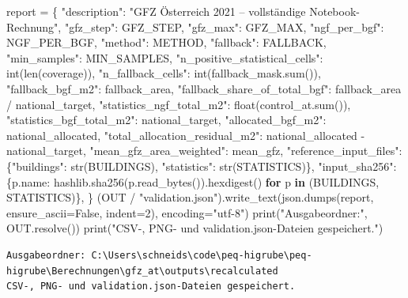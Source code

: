 \documentclass[
  ngerman,
  a4paper,
  DIV=11]{scrreprt}
\newenvironment{Shaded}{\begin{snugshade}}{\end{snugshade}}
\newcommand{\BuiltInTok}[1]{\textcolor[rgb]{0.00,0.23,0.31}{#1}}
\newcommand{\ControlFlowTok}[1]{\textcolor[rgb]{0.00,0.23,0.31}{\textbf{#1}}}
\newcommand{\DecValTok}[1]{\textcolor[rgb]{0.68,0.00,0.00}{#1}}
\newcommand{\KeywordTok}[1]{\textcolor[rgb]{0.00,0.23,0.31}{\textbf{#1}}}
\newcommand{\NormalTok}[1]{\textcolor[rgb]{0.00,0.23,0.31}{#1}}
\newcommand{\OperatorTok}[1]{\textcolor[rgb]{0.37,0.37,0.37}{#1}}
\newcommand{\StringTok}[1]{\textcolor[rgb]{0.13,0.47,0.30}{#1}}
\newcommand{\VariableTok}[1]{\textcolor[rgb]{0.07,0.07,0.07}{#1}}
\begin{document}
\begin{Shaded}
\begin{Highlighting}[]
\NormalTok{report }\OperatorTok{=}\NormalTok{ \{}
    \StringTok{"description"}\NormalTok{: }\StringTok{"GFZ Österreich 2021 – vollständige Notebook{-}Rechnung"}\NormalTok{,}
    \StringTok{"gfz\_step"}\NormalTok{: GFZ\_STEP, }\StringTok{"gfz\_max"}\NormalTok{: GFZ\_MAX, }\StringTok{"ngf\_per\_bgf"}\NormalTok{: NGF\_PER\_BGF,}
    \StringTok{"method"}\NormalTok{: METHOD, }\StringTok{"fallback"}\NormalTok{: FALLBACK, }\StringTok{"min\_samples"}\NormalTok{: MIN\_SAMPLES,}
    \StringTok{"n\_positive\_statistical\_cells"}\NormalTok{: }\BuiltInTok{int}\NormalTok{(}\BuiltInTok{len}\NormalTok{(coverage)),}
    \StringTok{"n\_fallback\_cells"}\NormalTok{: }\BuiltInTok{int}\NormalTok{(fallback\_mask.}\BuiltInTok{sum}\NormalTok{()),}
    \StringTok{"fallback\_bgf\_m2"}\NormalTok{: fallback\_area,}
    \StringTok{"fallback\_share\_of\_total\_bgf"}\NormalTok{: fallback\_area }\OperatorTok{/}\NormalTok{ national\_target,}
    \StringTok{"statistics\_ngf\_total\_m2"}\NormalTok{: }\BuiltInTok{float}\NormalTok{(control\_at.}\BuiltInTok{sum}\NormalTok{()),}
    \StringTok{"statistics\_bgf\_total\_m2"}\NormalTok{: national\_target,}
    \StringTok{"allocated\_bgf\_m2"}\NormalTok{: national\_allocated,}
    \StringTok{"total\_allocation\_residual\_m2"}\NormalTok{: national\_allocated }\OperatorTok{{-}}\NormalTok{ national\_target,}
    \StringTok{"mean\_gfz\_area\_weighted"}\NormalTok{: mean\_gfz,}
    \StringTok{"reference\_input\_files"}\NormalTok{: \{}\StringTok{"buildings"}\NormalTok{: }\BuiltInTok{str}\NormalTok{(BUILDINGS), }\StringTok{"statistics"}\NormalTok{: }\BuiltInTok{str}\NormalTok{(STATISTICS)\},}
    \StringTok{"input\_sha256"}\NormalTok{: \{p.name: hashlib.sha256(p.read\_bytes()).hexdigest()}
                     \ControlFlowTok{for}\NormalTok{ p }\KeywordTok{in}\NormalTok{ (BUILDINGS, STATISTICS)\},}
\NormalTok{\}}
\NormalTok{(OUT }\OperatorTok{/} \StringTok{"validation.json"}\NormalTok{).write\_text(json.dumps(report, ensure\_ascii}\OperatorTok{=}\VariableTok{False}\NormalTok{, indent}\OperatorTok{=}\DecValTok{2}\NormalTok{), encoding}\OperatorTok{=}\StringTok{"utf{-}8"}\NormalTok{)}
\BuiltInTok{print}\NormalTok{(}\StringTok{"Ausgabeordner:"}\NormalTok{, OUT.resolve())}
\BuiltInTok{print}\NormalTok{(}\StringTok{"CSV{-}, PNG{-} und validation.json{-}Dateien gespeichert."}\NormalTok{)}
\end{Highlighting}
\end{Shaded}

\begin{verbatim}
Ausgabeordner: C:\Users\schneids\code\peq-higrube\peq-higrube\Berechnungen\gfz_at\outputs\recalculated
CSV-, PNG- und validation.json-Dateien gespeichert.
\end{verbatim}
\end{document}
